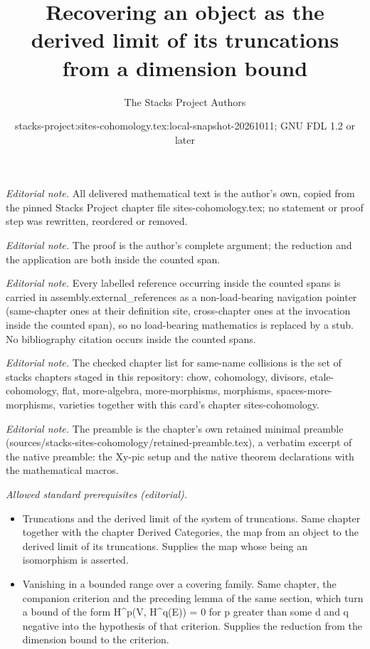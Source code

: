 \documentclass[10pt,a4paper]{amsart}
\title{Recovering an object as the derived limit of its truncations from a dimension bound}
\author{The Stacks Project Authors}
\date{stacks-project:sites-cohomology.tex:local-snapshot-20261011; GNU FDL 1.2 or later}
\theoremstyle{plain}
\theoremstyle{definition}
\theoremstyle{remark}
\numberwithin{equation}{subsection}
\begin{document}
\maketitle
\noindent\textit{Editorial note.} All delivered mathematical text is the author's own, copied from the pinned Stacks Project chapter file sites-cohomology.tex; no statement or proof step was rewritten, reordered or removed.\par\medskip
\noindent\textit{Editorial note.} The proof is the author's complete argument; the reduction and the application are both inside the counted span.\par\medskip
\noindent\textit{Editorial note.} Every labelled reference occurring inside the counted spans is carried in assembly.external\_references as a non-load-bearing navigation pointer (same-chapter ones at their definition site, cross-chapter ones at the invocation inside the counted span), so no load-bearing mathematics is replaced by a stub. No bibliography citation occurs inside the counted spans.\par\medskip
\noindent\textit{Editorial note.} The checked chapter list for same-name collisions is the set of stacks chapters staged in this repository: chow, cohomology, divisors, etale-cohomology, flat, more-algebra, more-morphisms, morphisms, spaces-more-morphisms, varieties together with this card's chapter sites-cohomology.\par\medskip
\noindent\textit{Editorial note.} The preamble is the chapter's own retained minimal preamble (sources/stacks-sites-cohomology/retained-preamble.tex), a verbatim excerpt of the native preamble: the Xy-pic setup and the native theorem declarations with the mathematical macros.\par\medskip
\noindent\textit{Allowed standard prerequisites (editorial).}\begin{itemize}
\item Truncations and the derived limit of the system of truncations. Same chapter together with the chapter Derived Categories, the map from an object to the derived limit of its truncations. Supplies the map whose being an isomorphism is asserted.
\item Vanishing in a bounded range over a covering family. Same chapter, the companion criterion and the preceding lemma of the same section, which turn a bound of the form H\textasciicircum{}p(V, H\textasciicircum{}q(E)) = 0 for p greater than some d and q negative into the hypothesis of that criterion. Supplies the reduction from the dimension bound to the criterion.
\end{itemize}\medskip
\end{document}
